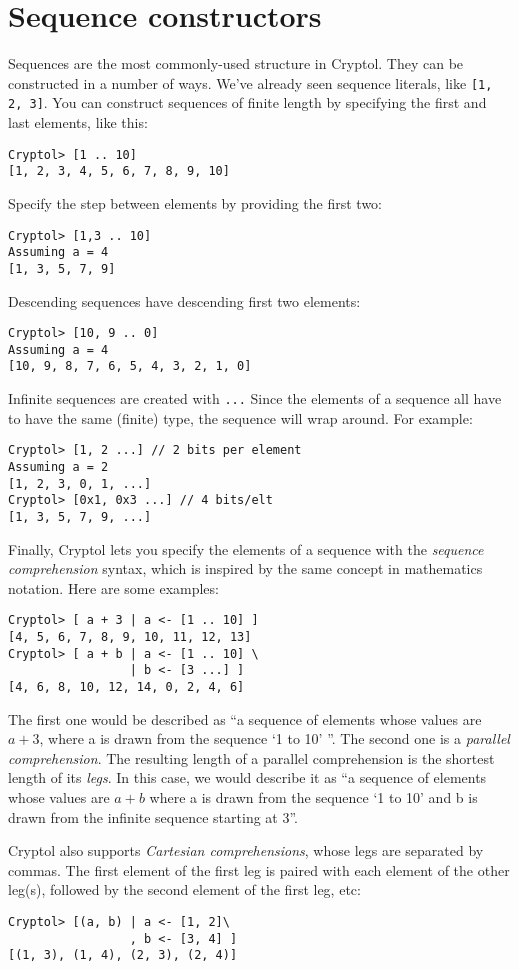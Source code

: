 \documentclass[9pt,letter]{article}
\begin{document}
\section{Sequence constructors}
Sequences are the most commonly-used
structure in Cryptol. They can be constructed in a number of ways. We've already seen sequence literals, like \verb+[1, 2, 3]+.
You can construct sequences of finite length by specifying the first and last elements, like this:
\begin{verbatim}
Cryptol> [1 .. 10]
[1, 2, 3, 4, 5, 6, 7, 8, 9, 10]
\end{verbatim}
Specify the step between elements by providing the first two:
\begin{verbatim}
Cryptol> [1,3 .. 10]
Assuming a = 4
[1, 3, 5, 7, 9]
\end{verbatim}
Descending sequences have descending first two elements:
\begin{verbatim}
Cryptol> [10, 9 .. 0]
Assuming a = 4
[10, 9, 8, 7, 6, 5, 4, 3, 2, 1, 0]
\end{verbatim}
Infinite sequences are created with \verb+...+ Since the elements of a sequence all have to have the same (finite) type, the sequence will wrap around.  For example:
\begin{verbatim}
Cryptol> [1, 2 ...] // 2 bits per element
Assuming a = 2
[1, 2, 3, 0, 1, ...]
Cryptol> [0x1, 0x3 ...] // 4 bits/elt
[1, 3, 5, 7, 9, ...]
\end{verbatim}
Finally, Cryptol lets you specify the elements of a sequence with the {\it sequence comprehension} syntax, which is inspired by the same concept in mathematics notation. Here are some examples:
\begin{verbatim}
Cryptol> [ a + 3 | a <- [1 .. 10] ]
[4, 5, 6, 7, 8, 9, 10, 11, 12, 13]
Cryptol> [ a + b | a <- [1 .. 10] \
                 | b <- [3 ...] ]
[4, 6, 8, 10, 12, 14, 0, 2, 4, 6]
\end{verbatim}
The first one would be described as ``a sequence of elements whose
values are $a + 3$, where a is drawn from the sequence `1 to 10' ''.
The second one is a {\it parallel comprehension}. The resulting length
of a parallel comprehension is the shortest length of its {\it legs}.
In this case, we would describe it as ``a sequence of elements whose
values are $a + b$ where a is drawn from the sequence `1 to 10' and b
is drawn from the infinite sequence starting at 3''.

Cryptol also supports {\it Cartesian comprehensions}, whose legs are
separated by commas. The first element of the first leg is paired with
each element of the other leg(s), followed by the second element of
the first leg, etc:
\begin{verbatim}
Cryptol> [(a, b) | a <- [1, 2]\
                 , b <- [3, 4] ]
[(1, 3), (1, 4), (2, 3), (2, 4)]
\end{verbatim}
\end{document}
